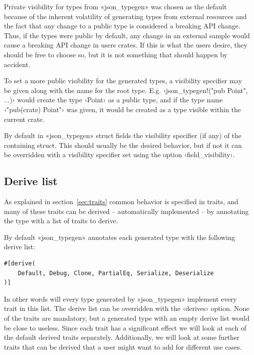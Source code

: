 Private visibility for types from «json_typegen» was chosen as the default because of the inherent volatility of generating types from external resources and the fact that any change to a public type is considered a breaking API change. Thus, if the types were public by default, any change in an external sample would cause a breaking API change in users crates. If this is what the users desire, they should be free to choose so, but it is not something that should happen by accident.

To set a more public visibility for the generated types, a visibility specifier may be given along with the name for the root type. E.g. ‹json_typegen!("pub Point", ...)› would create the type ‹Point› as a public type, and if the type name ‹"pub(crate) Point"› was given, it would be created as a type visible within the current crate.

By default in «json_typegen» struct fields  the visibility specifier (if any) of the containing struct. This should usually be the desired behavior, but if not it can be overridden with a visibility specifier set using the option ‹field_visibility›.

\subsection{Derive list}
\label{sec:derive-list}

As explained in section~\ref{sec:traits} common behavior is specified in traits, and many of these traits can be derived -- automatically implemented -- by annotating the type with a list of traits to derive.

By default «json_typegen» annotates each generated type with the following derive list:

\begin{verbatim}
#[derive(
    Default, Debug, Clone, PartialEq, Serialize, Deserialize
)]
\end{verbatim}

In other words will every type generated by «json_typegen» implement every trait in this list. The derive list can be overridden with the ‹derives› option. None of the traits are mandatory, but a generated type with an empty derive list would be close to useless. Since each trait has a significant effect we will look at each of the default derived traits separately. Additionally, we will look at some further traits that can be derived that a user might want to add for different use cases.

